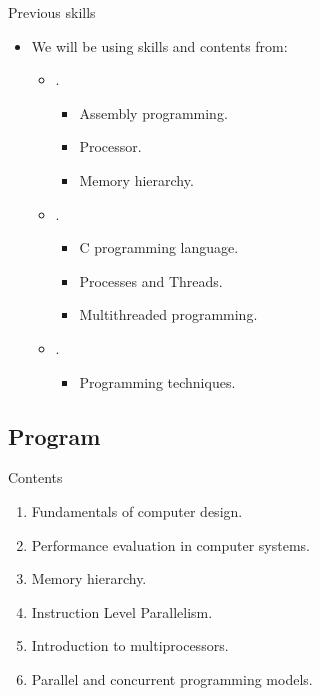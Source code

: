 \begin{frame}[t]{Previous skills}
\begin{itemize}
  \item We will be using skills and contents from:
    \begin{itemize}

      \item {}.
        \begin{itemize}
          \item Assembly programming.
          \item Processor.
          \item Memory hierarchy.
        \end{itemize}

      \item {}.
        \begin{itemize}
          \item C programming language.
          \item Processes and Threads.
          \item Multithreaded programming.
        \end{itemize}

      \item {}.
        \begin{itemize}
          \item Programming techniques.
        \end{itemize}
    \end{itemize}

\end{itemize}
\end{frame}

\subsection{Program}

\begin{frame}[t]{Contents}
\begin{enumerate}

  \item Fundamentals of computer design.

  \item Performance evaluation in computer systems.

  \item Memory hierarchy.

  \item Instruction Level Parallelism.

  \item Introduction to multiprocessors.

  \item Parallel and concurrent programming models.
\end{enumerate}
\end{frame}
